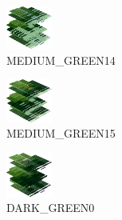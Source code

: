 \hspace{0.1cm}
\begin{minipage}[b]{0.15\linewidth}
\begin{figure}[H]                                                          
  \centering                                                             
  \begin{adjustbox}{width=1.5cm,center}                                   
  \includegraphics[width=1.5cm]{src/colorspace_colourflow/flows/colourflow_206-45.png}%
  \end{adjustbox}                                                        
\caption*{MEDIUM\_GREEN14}                                           
\end{figure}                                                               
\end{minipage}
\hspace{0.1cm}
\begin{minipage}[b]{0.15\linewidth}
\begin{figure}[H]                                                          
  \centering                                                             
  \begin{adjustbox}{width=1.5cm,center}                                   
  \includegraphics[width=1.5cm]{src/colorspace_colourflow/flows/colourflow_207-45.png}%
  \end{adjustbox}                                                        
\caption*{MEDIUM\_GREEN15}                                           
\end{figure}                                                               
\end{minipage}
\hspace{0.1cm}
\begin{minipage}[b]{0.15\linewidth}
\begin{figure}[H]                                                          
  \centering                                                             
  \begin{adjustbox}{width=1.5cm,center}                                   
  \includegraphics[width=1.5cm]{src/colorspace_colourflow/flows/colourflow_208-45.png}%
  \end{adjustbox}                                                        
\caption*{DARK\_GREEN0}                                           
\end{figure}                                                               
\end{minipage}
